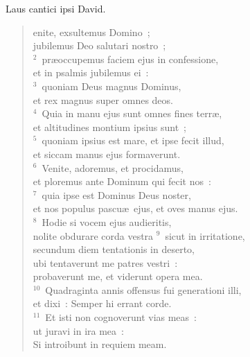 \bchapter[Psalm]
Laus cantici ipsi David. \begin{verse}enite, exsultemus Domino~;\\ jubilemus Deo salutari nostro~;\\
${}^{2}$~pr\ae occupemus faciem ejus in confessione,\\ et in psalmis jubilemus ei~:\\
${}^{3}$~quoniam Deus magnus Dominus,\\ et rex magnus super omnes deos.\\
${}^{4}$~Quia in manu ejus sunt omnes fines terr\ae ,\\ et altitudines montium ipsius sunt~;\\
${}^{5}$~quoniam ipsius est mare, et ipse fecit illud,\\ et siccam manus ejus formaverunt.\\
${}^{6}$~Venite, adoremus, et procidamus,\\ et ploremus ante Dominum qui fecit nos~:\\
${}^{7}$~quia ipse est Dominus Deus noster,\\ et nos populus pascu\ae\ ejus, et oves manus ejus.\\
${}^{8}$~Hodie si vocem ejus audieritis,\\ nolite obdurare corda vestra
${}^{9}$~sicut in irritatione,\\ secundum diem tentationis in deserto,\\ ubi tentaverunt me patres vestri~:\\ probaverunt me, et viderunt opera mea.\\
${}^{10}$~Quadraginta annis offensus fui generationi illi,\\ et dixi~: Semper hi errant corde.\\
${}^{11}$~Et isti non cognoverunt vias meas~:\\ ut juravi in ira mea~:\\ Si introibunt in requiem meam.\end{verse}



